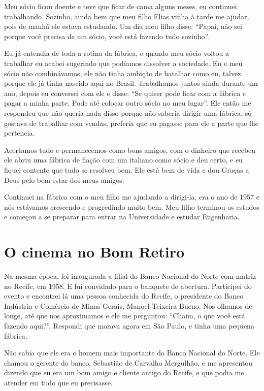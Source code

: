 Meu sócio ficou doente e teve que ficar de cama alguns meses, eu
continuei trabalhando. Sozinho, ainda bem que meu filho Elias vinha à
tarde me ajudar, pois de manhã ele estava estudando. Um dia meu filho
disse: ``Papai, não sei porque você precisa de um sócio, você está
fazendo tudo sozinho''.

Eu já entendia de toda a rotina da fábrica, e quando meu sócio voltou a
trabalhar eu acabei sugerindo que podíamos dissolver a sociedade. Eu e
meu sócio não combinávamos, ele não tinha ambição de batalhar como eu,
talvez porque ele já tinha nascido aqui no Brasil. Trabalhamos juntos
ainda durante um ano, depois eu conversei com ele e disse: ``Se quiser
pode ficar com a fábrica e pagar a minha parte. Pode até colocar outro
sócio no meu lugar''. Ele então me respondeu que não queria nada disso
porque não saberia dirigir uma fábrica, só gostava de trabalhar com
vendas, preferia que eu pagasse para ele a parte que lhe pertencia.

Acertamos tudo e permanecemos como bons amigos, com o dinheiro que
recebeu ele abriu uma fábrica de fiação com um italiano como sócio e deu
certo, e eu fiquei contente que tudo se resolveu bem. Ele está bem de
vida e dou Graças a Deus pelo bem estar dos meus amigos.

Continuei na fábrica com o meu filho me ajudando a dirigi-la, era o ano
de 1957 e nós estávamos crescendo e progredindo muito bem. Meu filho
terminou os estudos e começou a se preparar para entrar na Universidade
e estudar Engenharia.

\chapter{O cinema no Bom Retiro}

Na mesma época, foi inaugurada a filial do Banco Nacional do Norte com
matriz no Recife, em 1958. E fui convidado para o
banquete de abertura. Participei do evento e encontrei lá uma pessoa conhecida do Recife, o presidente do Banco
Indústria e Comércio de Minas Gerais, Manoel Teixeira Bueno.
Nos olhamos de longe, até que nos aproximamos e ele me perguntou:
``Chaim, o que você está fazendo aqui?''. Respondi que morava agora em São
Paulo, e tinha uma pequena fábrica.

Não sabia que ele era o homem mais importante do Banco Nacional do
Norte. Ele chamou o gerente do banco, Sebastião de Carvalho Mergulhão, e
me apresentou dizendo que eu era um bom amigo e cliente antigo do
Recife, e que podia me atender em tudo que eu precisasse.

